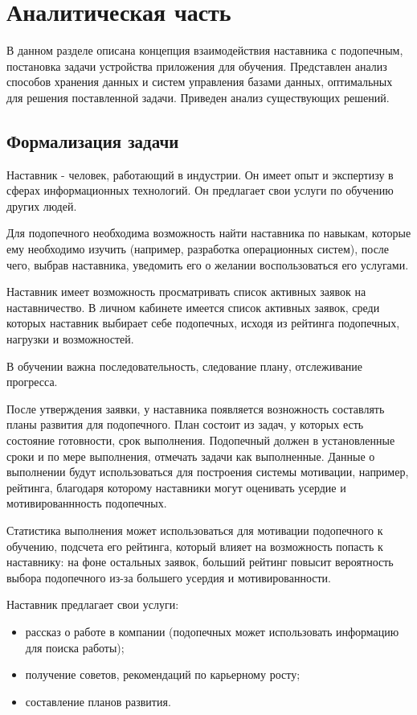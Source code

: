 \chapter{Аналитическая часть}

В данном разделе описана концепция взаимодействия наставника с подопечным, постановка задачи устройства приложения для обучения.
Представлен анализ способов хранения данных и систем управления базами данных, оптимальных для решения поставленной задачи.
Приведен анализ существующих решений.

\section{Формализация задачи}

Наставник - человек, работающий в индустрии. Он имеет опыт и экспертизу в сферах информационных технологий.
Он предлагает свои услуги по обучению других людей.

Для подопечного необходима возможность найти наставника по навыкам, которые ему необходимо изучить (например, разработка операционных систем), после чего,
выбрав наставника, уведомить его о желании воспользоваться его услугами.

Наставник имеет возможность просматривать список активных заявок на наставничество.
В личном кабинете имеется список активных заявок, среди которых наставник выбирает себе подопечных, исходя из рейтинга подопечных,
нагрузки и возможностей.

В обучении важна последовательность, следование плану, отслеживание прогресса.

После утверждения заявки, у наставника появляется возножность составлять планы развития для подопечного.
План состоит из задач, у которых есть состояние готовности, срок выполнения.
Подопечный должен в установленные сроки и по мере выполнения, отмечать задачи как выполненные.
Данные о выполнении будут использоваться для построения системы мотивации, например, рейтинга, благодаря которому
наставники могут оценивать усердие и мотивированнность подопечных.

Статистика выполнения может использоваться для мотивации подопечного к обучению, подсчета его рейтинга, который влияет на возможность попасть к наставнику:
на фоне остальных заявок, больший рейтинг повысит вероятность выбора подопечного из-за большего усердия и мотивированности.

Наставник предлагает свои услуги:
\begin{itemize}
    \item рассказ о работе в компании (подопечных может использовать информацию для поиска работы);
    \item получение советов, рекомендаций по карьерному росту;
    \item составление планов развития.
\end{itemize}

